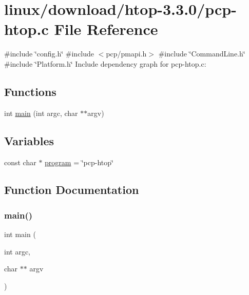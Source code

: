 \hypertarget{pcp-htop_8c}{}\section{linux/download/htop-\/3.3.0/pcp-\/htop.c File Reference}
\label{pcp-htop_8c}
{\ttfamily \#include \char`\"{}config.\+h\char`\"{}}\newline
{\ttfamily \#include $<$pcp/pmapi.\+h$>$}\newline
{\ttfamily \#include \char`\"{}Command\+Line.\+h\char`\"{}}\newline
{\ttfamily \#include \char`\"{}Platform.\+h\char`\"{}}\newline
Include dependency graph for pcp-\/htop.c\+:
\subsection*{Functions}
\begin{DoxyCompactItemize}
\item 
int \hyperlink{pcp-htop_8c_a3c04138a5bfe5d72780bb7e82a18e627}{main} (int argc, char $\ast$$\ast$argv)
\end{DoxyCompactItemize}
\subsection*{Variables}
\begin{DoxyCompactItemize}
\item 
const char $\ast$ \hyperlink{pcp-htop_8c_ae6fdcbeb0523d3cfa9377bf1b478aef0}{program} = \char`\"{}pcp-\/htop\char`\"{}
\end{DoxyCompactItemize}


\subsection{Function Documentation}
\mbox{\label{pcp-htop_8c_a3c04138a5bfe5d72780bb7e82a18e627}} 
\subsubsection{\texorpdfstring{main()}{main()}}
{\footnotesize\ttfamily int main (\begin{DoxyParamCaption}\item[{int}]{argc,  }\item[{char $\ast$$\ast$}]{argv }\end{DoxyParamCaption})}



